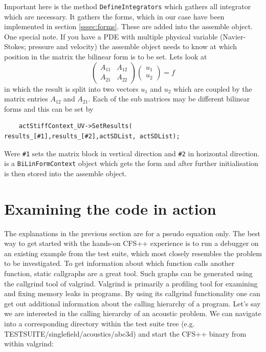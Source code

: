 Important here is the method \texttt{DefineIntegrators} which gathers all
integrator which are necessary. It gathers the forms, which in our case have
been implemented in section \ref{sssec:forms}. These are added into the assemble
object.\\
One special note. If you have a PDE with multiple physical variable
(Navier-Stokes; pressure and velocity) the assemble object needs to know at
which position in the matrix the bilinear form is to be set. Lets look at
\begin{equation}
  \left(\begin{array}{cc}
    A_{11} & A_{12}\\
    A_{21} & A_{22}
  \end{array}\right)
  \left(\begin{array}{c}
    u_1\\
    u_2
  \end{array}\right)=f
\end{equation}
in which the result is split into two vectors $u_1$ and $u_2$ which are coupled
by the matrix entries $A_{12}$ and $A_{21}$. Each of the sub matrices may be
different bilinear forms and this can be set by
\begin{verbatim}
    actStiffContext_UV->SetResults( results_[#1],results_[#2],actSDList, actSDList);
\end{verbatim}
Were \texttt{\#1} sets the matrix block in vertical direction and \texttt{\#2} in horizontal
direction. \texttt{} is a \texttt{BiLinFormContext} object which
gets the form and after further initialisation is then stored into the assemble
object.

\section{Examining the code in action}
\label{sec:code_in_action}

The explanations in  the previous section are for a  pseudo equation only. The
best  way to  get  started with  the hands-on  CFS++  experience is  to run  a
debugger  on an  existing  example from  the  test suite,  which most  closely
resembles  the problem  to be  investigated.  To  get information  about which
function  calls another  function, static  callgraphs are  a great  tool. Such
graphs can  be generated  using the callgrind  tool of valgrind.   Valgrind is
primarily a profiling tool for  examining and fixing memory leaks in programs.
By using  its callgrind functionality  one can get out  additional information
about the calling  hierarchy of a program. Let's say we  are interested in the
calling hierarchy of an acoustic problem. We can navigate into a corresponding
directory          within         the         test          suite         tree
(e.g. TESTSUITE/singlefield/acoustics/abc3d)  and start the  CFS++ binary from
within valgrind:

